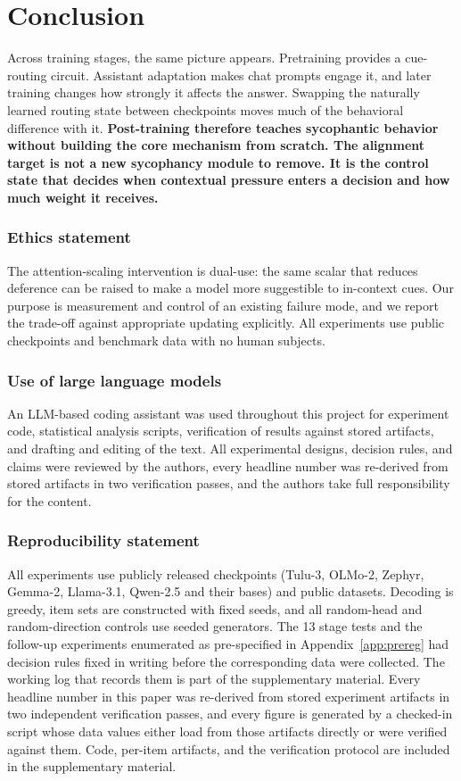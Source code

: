 \documentclass{article}
\begin{document}
\section{Conclusion}
\label{sec:conclusion}
Across training stages, the same picture appears. Pretraining provides a cue-routing circuit. Assistant adaptation makes chat prompts engage it, and later training changes how strongly it affects the answer. Swapping the naturally learned routing state between checkpoints moves much of the behavioral difference with it. \textbf{Post-training therefore teaches sycophantic behavior without building the core mechanism from scratch. The alignment target is not a new sycophancy module to remove. It is the control state that decides when contextual pressure enters a decision and how much weight it receives.}

\subsubsection*{Ethics statement}
The attention-scaling intervention is dual-use: the same scalar that reduces deference can be raised to make a model more suggestible to in-context cues. Our purpose is measurement and control of an existing failure mode, and we report the trade-off against appropriate updating explicitly. All experiments use public checkpoints and benchmark data with no human subjects.

\subsubsection*{Use of large language models}
An LLM-based coding assistant was used throughout this project for experiment code, statistical analysis scripts, verification of results against stored artifacts, and drafting and editing of the text. All experimental designs, decision rules, and claims were reviewed by the authors, every headline number was re-derived from stored artifacts in two verification passes, and the authors take full responsibility for the content.

\subsubsection*{Reproducibility statement}
All experiments use publicly released checkpoints (Tulu-3, OLMo-2, Zephyr, Gemma-2, Llama-3.1, Qwen-2.5 and their bases) and public datasets. Decoding is greedy, item sets are constructed with fixed seeds, and all random-head and random-direction controls use seeded generators. The 13 stage tests and the follow-up experiments enumerated as pre-specified in Appendix~\ref{app:prereg} had decision rules fixed in writing before the corresponding data were collected. The working log that records them is part of the supplementary material. Every headline number in this paper was re-derived from stored experiment artifacts in two independent verification passes, and every figure is generated by a checked-in script whose data values either load from those artifacts directly or were verified against them. Code, per-item artifacts, and the verification protocol are included in the supplementary material.
\end{document}
